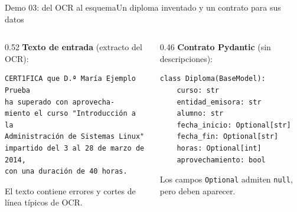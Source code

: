 \begin{frame}[fragile]{Demo 03: del OCR al esquema}{Un diploma inventado y un contrato para sus datos}
	\begin{columns}[T]
		\begin{column}{0.52\textwidth}
			{\scriptsize\textbf{Texto de entrada} (extracto del OCR):}
			\begin{lstlisting}[language={}]
CERT1FICA que D.ª María Ejemplo Prueba
ha superado con aprovecha-
miento el curso "Introducción a la
Administración de Sistemas Linux"
impartido del 3 al 28 de marzo de 2014,
con una duración de 40 horas.
\end{lstlisting}
			{\footnotesize El texto contiene errores y cortes de línea típicos de OCR.}
		\end{column}
		\begin{column}{0.46\textwidth}
			{\scriptsize\textbf{Contrato Pydantic} (sin descripciones):}
			\begin{lstlisting}
class Diploma(BaseModel):
    curso: str
    entidad_emisora: str
    alumno: str
    fecha_inicio: Optional[str]
    fecha_fin: Optional[str]
    horas: Optional[int]
    aprovechamiento: bool
\end{lstlisting}
			{\footnotesize Los campos \texttt{Optional} admiten \texttt{null}, pero deben aparecer.}
		\end{column}
	\end{columns}
\end{frame}

